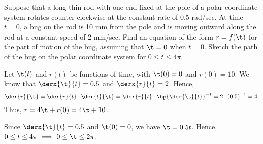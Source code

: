 \begin{problem}
    Suppose that a long thin rod with one end fixed at the pole of a polar coordinate system rotates counter-clockwise at the constant rate of 0.5 rad/sec. At time $t = 0$, a bug on the rod is 10 mm from the pole and is moving outward along the rod at a constant speed of 2 mm/sec. Find an equation of the form $r = f(\t)$ for the part of motion of the bug, assuming that $\t = 0$ when $t = 0$. Sketch the path of the bug on the polar coordinate system for $0 \leq t \leq 4\pi$.
\end{problem}
\begin{solution}
    Let $\t(t)$ and $r(t)$ be functions of time, with $\t(0) = 0$ and $r(0) = 10$. We know that $\derx{\t}{t} = 0.5$ and $\derx{r}{t} = 2$. Hence, \[\der{r}{\t} = \der{r}{t} \cdot \der{t}{\t} = \der{r}{t} \cdot \bp{\der{\t}{t}}^{-1} = 2 \cdot (0.5)^{-1} = 4.\] Thus, $r = 4\t + r(0) = 4\t + 10$.

    Since $\derx{\t}{t} = 0.5$ and $\t(0) = 0$, we have $\t = 0.5t$. Hence, $0 \leq t \leq 4\pi \implies 0 \leq \t \leq 2\pi$.

    \begin{center}
    \end{center}
\end{solution}

